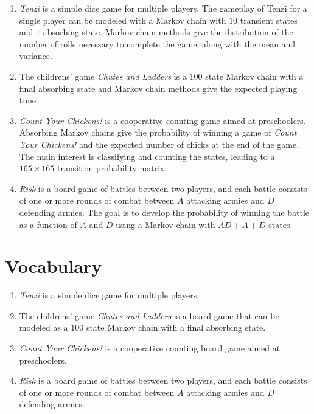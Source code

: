 \documentclass[12pt]{article}
\begin{document}
\begin{enumerate}
    \item
        \emph{Tenzi} is a simple dice game for multiple players.  The
        gameplay of Tenzi for a single player can be modeled with a
        Markov chain with \( 10 \) transient states and \( 1 \)
        absorbing state.  Markov chain methods give the distribution of
        the number of rolls necessary to complete the game, along with
        the mean and variance.
    \item
        The childrens' game \emph{Chutes and Ladders} is a \( 100 \)
        state Markov chain with a final absorbing state and Markov chain
        methods give the expected playing time.
    \item
        \emph{Count Your Chickens!} is a cooperative counting game aimed
        at preschoolers.  Absorbing Markov chains give the probability
        of winning a game of \emph{Count Your Chickens!} and the
        expected number of chicks at the end of the game.  The main
        interest is classifying and counting the states, leading to a \(
        165 \times 165 \) transition probability matrix.
    \item
        \emph{Risk} is a board game of battles between two players, and
        each battle consists of one or more rounds of combat between \(
        A \) attacking armies and \( D \) defending armies.  The goal is
        to develop the probability of winning the battle as a function
        of \( A \) and \( D \) using a Markov chain with \( AD + A + D \)
        states.
\end{enumerate}

\hr

\section*{Vocabulary}
\begin{enumerate}
    \item
        \emph{Tenzi} is a simple dice game for multiple players.
    \item
        The childrens' game \emph{Chutes and Ladders} is a board game
        that can be modeled as a \( 100 \) state Markov chain with a
        final absorbing state.
    \item
        \emph{Count Your Chickens!} is a cooperative counting board game
        aimed at preschoolers.
    \item
        \emph{Risk} is a board game of battles between two players, and
        each battle consists of one or more rounds of combat between \(
        A \) attacking armies and \( D \) defending armies.
\end{enumerate}
\end{document}
